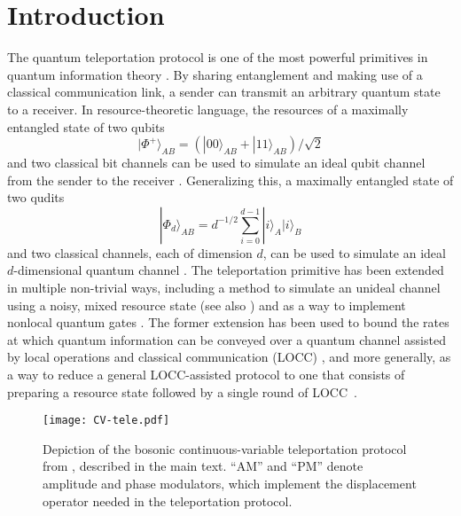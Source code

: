 \documentclass[apsrev,twocolumn]{revtex4-1}%
\begin{document}


\section{Introduction}

The quantum teleportation protocol is one of the most powerful primitives in
quantum information theory \cite{PhysRevLett.70.1895}. By sharing entanglement
and making use of a classical communication link, a sender can transmit an
arbitrary quantum state to a receiver. In resource-theoretic language, the
resources of a maximally entangled state of two qubits
\begin{equation}
|\Phi^{+}\rangle_{AB}=(|00\rangle_{AB}+|11\rangle_{AB})/\sqrt{2}%
\end{equation}
and two classical bit channels can be used to simulate an ideal qubit channel
from the sender to the receiver \cite{Bennett04,DHW05RI}. Generalizing this, a
maximally entangled state of two qudits
\begin{equation}
|\Phi_{d}\rangle_{AB}=d^{-1/2}\sum_{i=0}^{d-1}|i\rangle_{A}|i\rangle_{B}%
\end{equation}
and two classical channels, each of dimension $d$, can be used to simulate an
ideal $d$-dimensional quantum channel \cite{PhysRevLett.70.1895}. The
teleportation primitive has been extended in multiple non-trivial ways,
including a method to simulate an unideal channel using a noisy, mixed
resource state \cite[Section~V]{BDSW96} (see also
\cite{HHH99,WPG07,NFC09,Mul12}) and as a way to implement nonlocal quantum
gates \cite{GC99,STM11}. The former extension has been used to bound the rates
at which quantum information can be conveyed over a quantum channel assisted
by local operations and classical communication (LOCC) \cite{BDSW96,Mul12},
and more generally, as a way to reduce a general LOCC-assisted protocol to one
that consists of preparing a resource state followed by a single round of
LOCC~\cite{BDSW96,Mul12}.

\begin{figure}[ptb]
\begin{center}
\texttt{[image: CV-tele.pdf]}
\end{center}
\caption{Depiction of the bosonic continuous-variable teleportation protocol
from \cite{prl1998braunstein}, described in the main text. ``AM'' and ``PM''
denote amplitude and phase modulators, which implement the displacement
operator needed in the teleportation protocol.}%
\label{fig:CV-tele}\end{figure}
\end{document}
